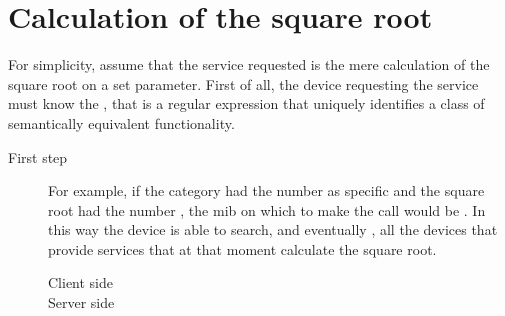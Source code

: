 \documentclass[a4paper,10pt,english,openany,oneside]{sphinxmanual}
\begin{document}
\section{Calculation of the square root}
\label{\detokenize{example:calculation-of-the-square-root}}
For simplicity, assume that the service requested is the mere calculation of the
square root on a set parameter. First of all, the device requesting the service must know the
, that is a regular expression that uniquely identifies a class of semantically equivalent functionality.
\begin{description}
\item[{First step}] \leavevmode
For example, if the category  had the number 
as specific  and the square root had the number ,
the mib on which to make the call would be .
In this way the device is able to search, and eventually
, all the devices that provide services that at that
moment calculate the square root.
\begin{description}
\item[{Client side}] \leavevmode
\begin{sphinxVerbatim}[commandchars=\\\{\}]
\PYG{p}{[}\PYG{p}{]}\PYG{p}{[}\PYG{p}{]}
\end{sphinxVerbatim}

\item[{Server side}] \leavevmode
\begin{sphinxVerbatim}[commandchars=\\\{\}]
  
\end{sphinxVerbatim}

\end{description}


\end{description}
\end{document}
